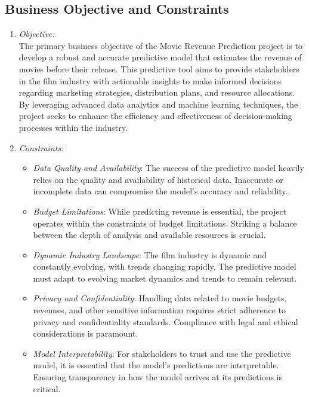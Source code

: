 \documentclass[conference]{IEEEtran}
\begin{document}
\subsection{Business Objective and Constraints}
\begin{enumerate}
    \item \textit{Objective:}\\
    The primary business objective of the Movie Revenue Prediction project is to develop a robust and accurate predictive model that estimates the revenue of movies before their release. This predictive tool aims to provide stakeholders in the film industry with actionable insights to make informed decisions regarding marketing strategies, distribution plans, and resource allocations. By leveraging advanced data analytics and machine learning techniques, the project seeks to enhance the efficiency and effectiveness of decision-making processes within the industry.\\
    \item \textit{Constraints:}
    \begin{itemize}
        \item \textit{Data Quality and Availability}: The success of the predictive model heavily relies on the quality and availability of historical data. Inaccurate or incomplete data can compromise the model's accuracy and reliability.

        \item \textit{Budget Limitations}: While predicting revenue is essential, the project operates within the constraints of budget limitations. Striking a balance between the depth of analysis and available resources is crucial.

        \item \textit{Dynamic Industry Landscape}: The film industry is dynamic and constantly evolving, with trends changing rapidly. The predictive model must adapt to evolving market dynamics and trends to remain relevant.

        \item \textit{Privacy and Confidentiality}: Handling data related to movie budgets, revenues, and other sensitive information requires strict adherence to privacy and confidentiality standards. Compliance with legal and ethical considerations is paramount.

        \item \textit{Model Interpretability}: For stakeholders to trust and use the predictive model, it is essential that the model's predictions are interpretable. Ensuring transparency in how the model arrives at its predictions is critical.


\end{itemize}
\end{enumerate}
\end{document}
